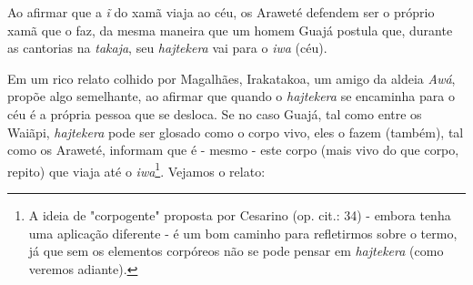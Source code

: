 Ao afirmar que a \emph{ĩ} do xamã viaja ao céu, os Araweté defendem ser
o próprio xamã que o faz, da mesma maneira que um homem Guajá postula
que, durante as cantorias na \emph{takaja}, seu \emph{hajtekera} vai
para o \emph{iwa} (céu).

Em um rico relato colhido por Magalhães, Irakatakoa, um amigo da aldeia
\emph{Awá}, propõe algo semelhante, ao afirmar que quando o
\emph{hajtekera} se encaminha para o céu é a própria pessoa que se
desloca. Se no caso Guajá, tal como entre os Waiãpi, \emph{hajtekera}
pode ser glosado como o corpo vivo, eles o fazem (também), tal como os
Araweté, informam que é - mesmo - este corpo (mais vivo do que corpo,
repito) que viaja até o \emph{iwa}\footnote{A ideia de "corpogente"
  proposta por Cesarino (op. cit.: 34) - embora tenha uma aplicação
  diferente - é um bom caminho para refletirmos sobre o termo, já que
  sem os elementos corpóreos não se pode pensar em \emph{hajtekera}
  (como veremos adiante).}. Vejamos o relato:

